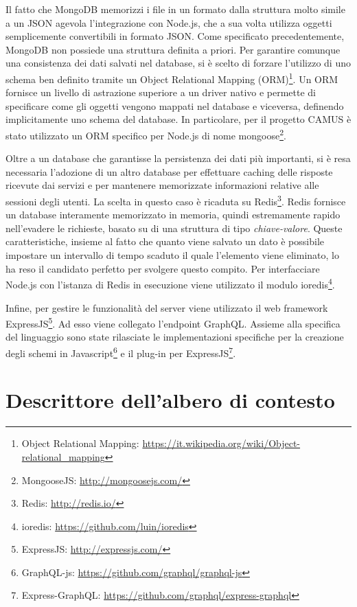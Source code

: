 Il fatto che MongoDB memorizzi i file in un formato dalla struttura molto simile a un JSON agevola l'integrazione con Node.js, che a sua volta utilizza oggetti semplicemente convertibili in formato JSON. Come specificato precedentemente, MongoDB non possiede una struttura definita a priori. Per garantire comunque una consistenza dei dati salvati nel database, si è scelto di forzare l'utilizzo di uno schema ben definito tramite un Object Relational Mapping (ORM)\footnote{Object Relational Mapping: \url{https://it.wikipedia.org/wiki/Object-relational_mapping}}. Un ORM fornisce un livello di astrazione superiore a un driver nativo e permette di specificare come gli oggetti vengono mappati nel database e viceversa, definendo implicitamente uno schema del database. In particolare, per il progetto CAMUS è stato utilizzato un ORM specifico per Node.js di nome mongoose\footnote{MongooseJS: \url{http://mongoosejs.com/}}.

Oltre a un database che garantisse la persistenza dei dati più importanti, si è resa necessaria l'adozione di un altro database per effettuare  caching delle risposte ricevute dai servizi e per mantenere memorizzate informazioni relative alle sessioni degli utenti. La scelta in questo caso è ricaduta su Redis\footnote{Redis: \url{http://redis.io/}}. Redis fornisce un database interamente memorizzato in memoria, quindi estremamente rapido nell'evadere le richieste, basato su di una struttura di tipo \emph{chiave-valore}. Queste caratteristiche, insieme al fatto che quanto viene salvato un dato è possibile impostare un intervallo di tempo scaduto il quale l'elemento viene eliminato, lo ha reso il candidato perfetto per svolgere questo compito. Per interfacciare Node.js con l'istanza di Redis in esecuzione viene utilizzato il modulo ioredis\footnote{ioredis: \url{https://github.com/luin/ioredis}}.

Infine, per gestire le funzionalità del server viene utilizzato il web framework ExpressJS\footnote{ExpressJS: \url{http://expressjs.com/}}. Ad esso viene collegato l'endpoint GraphQL. Assieme alla specifica del linguaggio sono state rilasciate le implementazioni specifiche per la creazione degli schemi in Javascript\footnote{GraphQL-js: \url{https://github.com/graphql/graphql-js}} e il plug-in per ExpressJS\footnote{Express-GraphQL: \url{https://github.com/graphql/express-graphql}}.

\section{Descrittore dell'albero di contesto\label{sec:descrittore-albero-contesto}}

